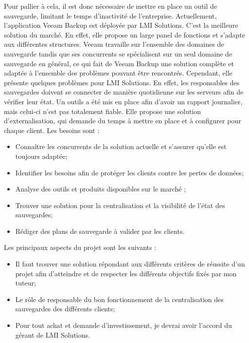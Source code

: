 \documentclass[pfe]{tnreport} %
\begin{document}
Pour pallier à cela, il est donc nécessaire de mettre en place un outil de sauvegarde, limitant le temps d'inactivité de l'entreprise. \newline
Actuellement, l'application Veeam Backup est déployée par LMI Solutions. \newline
C'est la meilleure solution du marché. En effet, elle propose un large panel de fonctions et s'adapte aux différentes structures. Veeam travaille sur l'ensemble des domaines de sauvegarde tandis que ses concurrents se spécialisent sur un seul domaine de sauvegarde en général, ce qui fait de Veeam Backup une solution complète et adaptée à l'ensemble des problèmes pouvant être rencontrés.\newline
Cependant, elle présente quelques problèmes pour LMI Solutions. En effet, les responsables des sauvegardes doivent se connecter de manière quotidienne sur les serveurs afin de vérifier leur état. \newline Un outils a été mis en place afin d'avoir un rapport journalier, mais celui-ci n'est pas totalement fiable. \newline
Elle propose une solution d'externalisation, qui demande du temps à mettre en place et à configurer pour chaque client. \newline
Les besoins sont : \newline
\begin{itemize}
 \item Connaître les concurrents de la solution actuelle et s'assurer qu'elle est toujours adaptée;
 \item Identifier les besoins afin de protéger les clients contre les pertes de données;
 \item Analyse des outils et produits disponibles sur le marché ;
 \item Trouver une solution pour la centralisation et la visibilité de l'état des sauvegardes;
 \item Rédiger des plans de sauvegarde à valider par les clients. \newline
\end{itemize}
Les principaux aspects du projet sont les suivants : \newline
\begin{itemize}
 \item Il faut trouver une solution répondant aux différents critères de réussite d'un projet afin d'atteindre et de respecter les différents objectifs fixés par mon tuteur; 
 \item Le rôle de responsable du bon fonctionnement de la centralisation des sauvegardes des différents clients;
 \item Pour tout achat et demande d’investissement, je devrai avoir l’accord du gérant de LMI Solutions. \newline
\end{itemize}
\end{document}
